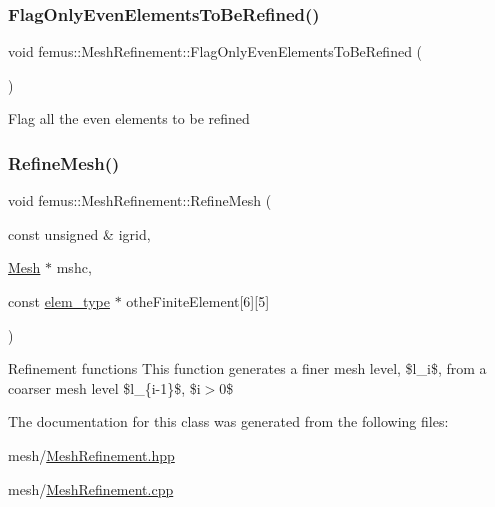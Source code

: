 \subsubsection{\texorpdfstring{Flag\+Only\+Even\+Elements\+To\+Be\+Refined()}{FlagOnlyEvenElementsToBeRefined()}}
{\footnotesize\ttfamily void femus\+::\+Mesh\+Refinement\+::\+Flag\+Only\+Even\+Elements\+To\+Be\+Refined (\begin{DoxyParamCaption}{ }\end{DoxyParamCaption})}

Flag all the even elements to be refined \mbox{\label{classfemus_1_1_mesh_refinement_a74f5d5b2f814b40108b0629b8d07e5a0}} 
\subsubsection{\texorpdfstring{Refine\+Mesh()}{RefineMesh()}}
{\footnotesize\ttfamily void femus\+::\+Mesh\+Refinement\+::\+Refine\+Mesh (\begin{DoxyParamCaption}\item[{const unsigned \&}]{igrid,  }\item[{\mbox{\hyperlink{classfemus_1_1_mesh}{Mesh}} $\ast$}]{mshc,  }\item[{const \mbox{\hyperlink{classfemus_1_1elem__type}{elem\+\_\+type}} $\ast$}]{othe\+Finite\+Element\mbox{[}6\mbox{]}\mbox{[}5\mbox{]} }\end{DoxyParamCaption})}

Refinement functions This function generates a finer mesh level, \$l\+\_\+i\$, from a coarser mesh level \$l\+\_\+\{i-\/1\}\$, \$i$>$0\$ 

The documentation for this class was generated from the following files\+:\begin{DoxyCompactItemize}
\item 
mesh/\mbox{\hyperlink{_mesh_refinement_8hpp}{Mesh\+Refinement.\+hpp}}\item 
mesh/\mbox{\hyperlink{_mesh_refinement_8cpp}{Mesh\+Refinement.\+cpp}}\end{DoxyCompactItemize}
